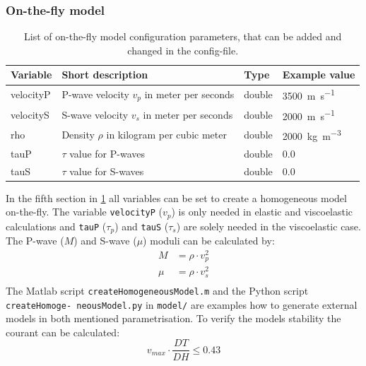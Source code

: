 \documentclass[pdftex,a4paper,parskip,listof=totoc,bibliography=totoc,onehalfspacing,12pt]{scrreprt}
\newcommand{\shellcmd}[1]{\indent\indent\texttt{#1}}	%
\begin{document}
\subsubsection{On-the-fly model}
\begin{table}[h!]
\caption[List of on-the-fly model configuration parameters.]{List of on-the-fly model configuration parameters, that can be added and changed in the config-file.}\label{tab:config_onthefly}
\centering
\begin{adjustbox}{width=0.8\textwidth,center=\textwidth}
	\begin{tabular}{llll}
	\toprule
	Variable & Short description & Type & Example value \\
	\midrule
	velocityP & P-wave velocity $v_p$ in meter per seconds & double & \SI{3500}{m\per s} \\
	velocityS& S-wave velocity $v_s$ in meter per seconds & double  & \SI{2000}{m\per s}\\
	rho& Density $\rho$ in kilogram per cubic meter & double &  \SI{2000}{kg\per\cubic\metre}\\
	tauP& $\tau$ value for P-waves & double & \num{0.0}\\
	tauS& $\tau$ value for S-waves & double & \num{0.0}\\
	\bottomrule
	\end{tabular}
	\end{adjustbox}
\end{table}
In the fifth section in \ref{tab:config_onthefly} all variables can be set to create a homogeneous model on-the-fly. The variable \verb+velocityP+ ($v_p$) is only needed in elastic and viscoelastic calculations and  \verb+tauP+ ($\tau_p$) and \verb+tauS+ ($\tau_s$) are solely needed in the viscoelastic case. 
The P-wave ($M$) and S-wave ($\mu$) moduli can be calculated by:
\begin{align*}
	M&=\rho\cdot v_p^2\\
	\mu &=\rho\cdot v_s^2\\
\end{align*}
The Matlab script \shellcmd{createHomogeneousModel.m} and the Python script \shellcmd{createHomoge- neousModel.py} in \shellcmd{model/} are examples how to generate external models in both mentioned parametrisation. 
To verify the models stability  the courant can be calculated: 
\begin{equation*}
	v_{max} \cdot \frac{DT}{DH} \leq 0.43
\end{equation*}
\end{document}
